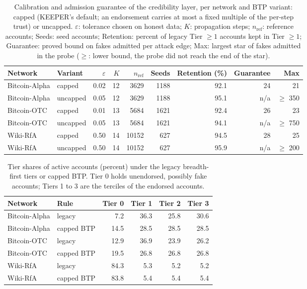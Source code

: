\begin{table}[!t]
\centering
\scriptsize
\setlength{\tabcolsep}{3pt}
\caption{Calibration and admission guarantee of the credibility layer, per network and BTP variant: capped (KEEPER's default; an endorsement carries at most a fixed multiple of the per-step trust) or uncapped. $\varepsilon$: tolerance chosen on honest data; $K$: propagation steps; $n_\mathrm{ref}$: reference accounts; Seeds: seed accounts; Retention: percent of legacy Tier $\ge 1$ accounts kept in Tier $\ge 1$; Guarantee: proved bound on fakes admitted per attack edge; Max: largest star of fakes admitted in the probe ($\ge$: lower bound, the probe did not reach the end of the star).}
\label{tab:s_s_credibility_calibration}
\begin{tabular}{@{}llrrrrrrr@{}}
\toprule
\textbf{Network} & \textbf{Variant} & \textbf{$\varepsilon$} & \textbf{$K$} & \textbf{$n_\mathrm{ref}$} & \textbf{Seeds} & \textbf{Retention (\%)} & \textbf{Guarantee} & \textbf{Max} \\
\midrule
Bitcoin-Alpha & capped & 0.02 & 12 & 3629 & 1188 & 92.1 & 24 & 21 \\
Bitcoin-Alpha & uncapped & 0.05 & 12 & 3629 & 1188 & 95.1 & n/a & $\ge$ 350 \\
Bitcoin-OTC & capped & 0.01 & 13 & 5684 & 1621 & 92.4 & 26 & 23 \\
Bitcoin-OTC & uncapped & 0.05 & 13 & 5684 & 1621 & 94.1 & n/a & $\ge$ 750 \\
Wiki-RfA & capped & 0.50 & 14 & 10152 & 627 & 94.5 & 28 & 25 \\
Wiki-RfA & uncapped & 0.50 & 14 & 10152 & 627 & 95.9 & n/a & $\ge$ 200 \\
\bottomrule
\end{tabular}
\end{table}

\begin{table}[!t]
\centering
\scriptsize
\setlength{\tabcolsep}{3pt}
\caption{Tier shares of active accounts (percent) under the legacy breadth-first tiers or capped BTP. Tier 0 holds unendorsed, possibly fake accounts; Tiers 1 to 3 are the terciles of the endorsed accounts.}
\label{tab:s_s_credibility_tiers}
\begin{tabular}{@{}llrrrr@{}}
\toprule
\textbf{Network} & \textbf{Rule} & \textbf{Tier 0} & \textbf{Tier 1} & \textbf{Tier 2} & \textbf{Tier 3} \\
\midrule
Bitcoin-Alpha & legacy & 7.2 & 36.3 & 25.8 & 30.6 \\
Bitcoin-Alpha & capped BTP & 14.5 & 28.5 & 28.5 & 28.5 \\
Bitcoin-OTC & legacy & 12.9 & 36.9 & 23.9 & 26.2 \\
Bitcoin-OTC & capped BTP & 19.5 & 26.8 & 26.8 & 26.8 \\
Wiki-RfA & legacy & 84.3 & 5.3 & 5.2 & 5.2 \\
Wiki-RfA & capped BTP & 83.8 & 5.4 & 5.4 & 5.4 \\
\bottomrule
\end{tabular}
\end{table}

